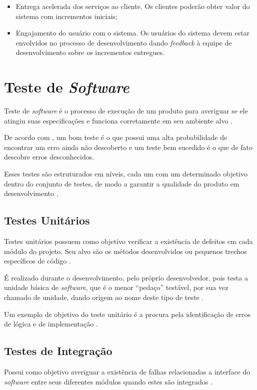 \begin{itemize}
    \item Entrega acelerada dos serviços ao cliente. Os clientes poderão obter valor do sistema com incrementos iniciais;
    \item Engajamento do usuário com o sistema. Os usuários do sistema devem estar envolvidos no processo
    de desenvolvimento dando \textit{feedback} à equipe de desenvolvimento sobre os incrementos entregues.
\end{itemize}

\section{Teste de \textit{Software}}
Teste de \textit{software} é o processo de execução de um produto para averiguar se ele atingiu suas especificações e funciona corretamente em seu ambiente alvo \cite{artigo_intro_teste}.

De acordo com , um bom teste é o que possui uma alta probabilidade de encontrar um erro ainda não descoberto e um teste bem sucedido é o que de fato descobre erros desconhecidos.

Esses testes são estruturados em níveis, cada um com um determinado objetivo dentro do conjunto de testes, de modo a garantir a qualidade do produto em desenvolvimento \cite{sw_test_tech}.

    \subsection{Testes Unitários}
    Testes unitários possuem como objetivo verificar a existência de defeitos em cada módulo do projeto. Seu alvo são os métodos desenvolvidos ou pequenos trechos específicos de código \cite{artigo_intro_teste}.

    É realizado durante o desenvolvimento, pelo próprio desenvolvedor, pois testa a unidade básica de \textit{software}, que é o menor ``pedaço''  testável, por sua vez chamado de unidade, dando origem ao nome deste tipo de teste \cite{sw_test_tech}.

    Um exemplo de objetivo do teste unitário é a procura pela identificação de erros de lógica e de implementação \cite{maldonado}.

    \subsection{Testes de Integração}
    Possui como objetivo averiguar a existência de falhas relacionadas a interface do \textit{software} entre seus diferentes módulos quando estes são integrados \cite{artigo_intro_teste}.

